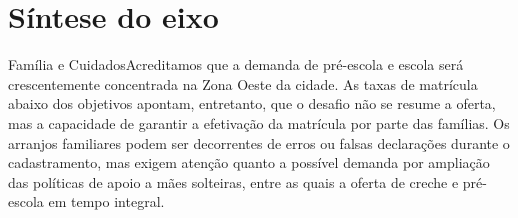 
\section{Síntese do eixo}

\begin{sintese}{Família e Cuidados}Acreditamos que a demanda de pré-escola e escola será crescentemente concentrada na Zona Oeste da cidade. As taxas de matrícula abaixo dos objetivos apontam, entretanto, que o desafio não se resume a oferta, mas a capacidade de garantir a efetivação da matrícula por parte das famílias. Os arranjos familiares podem ser decorrentes de erros ou falsas declarações durante o cadastramento, mas exigem atenção quanto a possível demanda por ampliação das políticas de apoio a mães solteiras, entre as quais a oferta de creche e pré-escola em tempo integral.\end{sintese}


